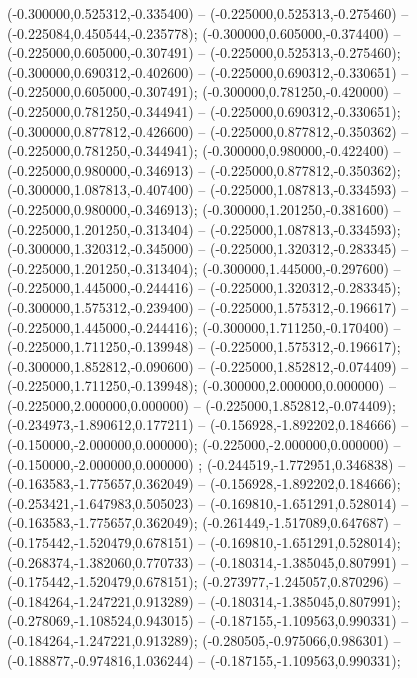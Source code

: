  (-0.300000,0.525312,-0.335400) -- (-0.225000,0.525313,-0.275460) -- (-0.225084,0.450544,-0.235778);
 (-0.300000,0.605000,-0.374400) -- (-0.225000,0.605000,-0.307491) -- (-0.225000,0.525313,-0.275460);
 (-0.300000,0.690312,-0.402600) -- (-0.225000,0.690312,-0.330651) -- (-0.225000,0.605000,-0.307491);
 (-0.300000,0.781250,-0.420000) -- (-0.225000,0.781250,-0.344941) -- (-0.225000,0.690312,-0.330651);
 (-0.300000,0.877812,-0.426600) -- (-0.225000,0.877812,-0.350362) -- (-0.225000,0.781250,-0.344941);
 (-0.300000,0.980000,-0.422400) -- (-0.225000,0.980000,-0.346913) -- (-0.225000,0.877812,-0.350362);
 (-0.300000,1.087813,-0.407400) -- (-0.225000,1.087813,-0.334593) -- (-0.225000,0.980000,-0.346913);
 (-0.300000,1.201250,-0.381600) -- (-0.225000,1.201250,-0.313404) -- (-0.225000,1.087813,-0.334593);
 (-0.300000,1.320312,-0.345000) -- (-0.225000,1.320312,-0.283345) -- (-0.225000,1.201250,-0.313404);
 (-0.300000,1.445000,-0.297600) -- (-0.225000,1.445000,-0.244416) -- (-0.225000,1.320312,-0.283345);
 (-0.300000,1.575312,-0.239400) -- (-0.225000,1.575312,-0.196617) -- (-0.225000,1.445000,-0.244416);
 (-0.300000,1.711250,-0.170400) -- (-0.225000,1.711250,-0.139948) -- (-0.225000,1.575312,-0.196617);
 (-0.300000,1.852812,-0.090600) -- (-0.225000,1.852812,-0.074409) -- (-0.225000,1.711250,-0.139948);
 (-0.300000,2.000000,0.000000) -- (-0.225000,2.000000,0.000000) -- (-0.225000,1.852812,-0.074409);
 (-0.234973,-1.890612,0.177211) -- (-0.156928,-1.892202,0.184666) -- (-0.150000,-2.000000,0.000000);
 (-0.225000,-2.000000,0.000000) -- (-0.150000,-2.000000,0.000000) ;
 (-0.244519,-1.772951,0.346838) -- (-0.163583,-1.775657,0.362049) -- (-0.156928,-1.892202,0.184666);
 (-0.253421,-1.647983,0.505023) -- (-0.169810,-1.651291,0.528014) -- (-0.163583,-1.775657,0.362049);
 (-0.261449,-1.517089,0.647687) -- (-0.175442,-1.520479,0.678151) -- (-0.169810,-1.651291,0.528014);
 (-0.268374,-1.382060,0.770733) -- (-0.180314,-1.385045,0.807991) -- (-0.175442,-1.520479,0.678151);
 (-0.273977,-1.245057,0.870296) -- (-0.184264,-1.247221,0.913289) -- (-0.180314,-1.385045,0.807991);
 (-0.278069,-1.108524,0.943015) -- (-0.187155,-1.109563,0.990331) -- (-0.184264,-1.247221,0.913289);
 (-0.280505,-0.975066,0.986301) -- (-0.188877,-0.974816,1.036244) -- (-0.187155,-1.109563,0.990331);
